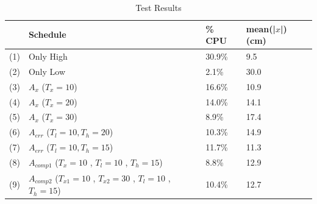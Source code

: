 \documentclass{sig-alternate-ipsn13}
\begin{document}
\begin{table}[htbp]
    \caption{Test Results}
    \begin{center}
        \begin{tabular}{c  | m{10em} |  m{4em} | m{5em} }
            \hline
            & \textbf{Schedule}& \textbf{\% CPU}  & \textbf{mean(|$x$|) (cm)} \\
            \hline
            (1)& Only High & 30.9\% & 9.5\\
            \hline
            (2)& Only Low & 2.1\% & 30.0\\
            \hline
            (3)& $A_{x}$  ($T_x=10$) & 16.6\% & 10.9\\
            \hline
            (4)& $A_{x}$  ($T_x=20$)  & 14.0\% & 14.1  \\
            \hline
            (5)& $A_{x}$  ($T_x=30$)  & 8.9\% & 17.4  \\
            \hline
            (6)& $A_{err}$ \newline ($T_l=10 , T_h=20$) & 10.3\% & 14.9 \\
            \hline
            (7)& $A_{err}$ \newline ($T_l=10 , T_h=15$) & 11.7\% & 11.3 \\
            \hline
            (8)& $A_{comp1}$ \newline ($T_x=10$ , $T_l=10$ , $T_h=15$)  & 8.8\% & 12.9 \\
            \hline
            (9)& $A_{comp2}$ \newline ($T_{x1}=10$ , $T_{x2}=30$ , $T_l=10$ , $T_h=15$)   & 10.4\% & 12.7 \\
            \hline
            
        \end{tabular}
        \label{tab:results}
    \end{center}
\end{table}
\end{document}
